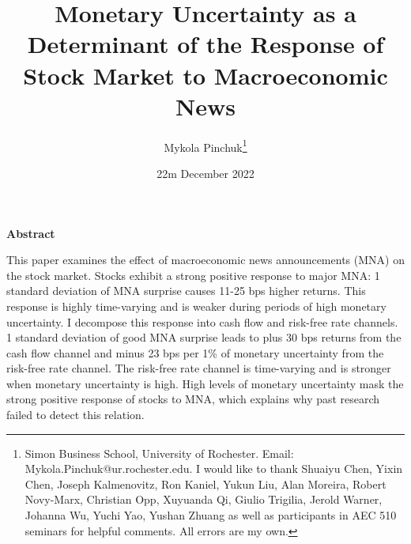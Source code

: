 \documentclass[12pt]{article}
\begin{document}
\onehalfspacing      %
\renewcommand{\footnote}{\endnote}  %

\author{\large{Mykola Pinchuk}\thanks{\rm Simon Business School, University of Rochester. Email: Mykola.Pinchuk@ur.rochester.edu. \newline I would like to thank Shuaiyu Chen, Yixin Chen, Joseph Kalmenovitz, Ron Kaniel, Yukun Liu, Alan Moreira, Robert Novy-Marx, Christian Opp, Xuyuanda Qi, Giulio Trigilia, Jerold Warner, Johanna Wu, Yuchi Yao, Yushan Zhuang as well as participants in AEC 510 seminars for helpful comments. All errors are my own.}}

\title{\bf Monetary Uncertainty as a Determinant of the Response of Stock Market to Macroeconomic News}

\date{22m December 2022}  

\maketitle
\thispagestyle{empty}

\bigskip

\normalsize

\vspace{1cm}

\centerline{\bf Abstract}

\vspace{0.5cm}

\begin{onehalfspace}  %
  \noindent This paper examines the effect of macroeconomic news announcements (MNA) on the stock market. Stocks exhibit a strong positive response to major MNA: 1 standard deviation of MNA surprise causes 11-25 bps higher returns. This response is highly time-varying and is weaker during periods of high monetary uncertainty. I decompose this response into cash flow and risk-free rate channels. 1 standard deviation of good MNA surprise leads to plus 30 bps returns from the cash flow channel and minus 23 bps per 1\% of monetary uncertainty from the risk-free rate channel. The risk-free rate channel is time-varying and is stronger when monetary uncertainty is high. High levels of monetary uncertainty mask the strong positive response of stocks to MNA, which explains why past research failed to detect this relation.  
\end{onehalfspace}
\medskip
\end{document}
